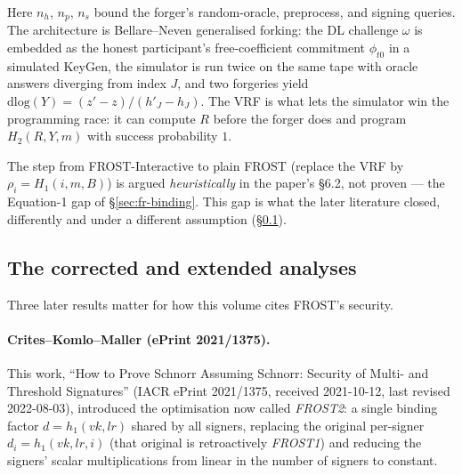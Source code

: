 \documentclass[11pt,a4paper]{article}
\theoremstyle{definition}
\begin{document}
Here $n_h$, $n_p$, $n_s$ bound the forger's random-oracle, preprocess,
and signing queries. The architecture is Bellare--Neven generalised
forking: the DL challenge $\omega$ is embedded as the honest
participant's free-coefficient commitment $\phi_{t0}$ in a simulated
KeyGen, the simulator is run twice on the same tape with oracle answers
diverging from index $J$, and two forgeries yield
$\mathrm{dlog}(Y) = (z' - z)/(h'_J - h_J)$. The VRF is what lets the
simulator win the programming race: it can compute $R$ before the forger
does and program $H_2(R, Y, m)$ with success probability $1$.

The step from FROST-Interactive to plain FROST (replace the VRF by
$\rho_i = H_1(i, m, B)$) is argued \emph{heuristically} in the paper's
\S6.2, not proven --- the Equation-1 gap of \S\ref{sec:fr-binding}. This
gap is what the later literature closed, differently and under a
different assumption (\S\ref{sec:fr-later}).

\subsection{The corrected and extended analyses}\label{sec:fr-later}

Three later results matter for how this volume cites FROST's security.

\paragraph{Crites--Komlo--Maller (ePrint 2021/1375).} This work, ``How
to Prove Schnorr Assuming Schnorr: Security of Multi- and Threshold
Signatures'' (IACR ePrint 2021/1375, received 2021-10-12, last revised
2022-08-03), introduced the optimisation now called \emph{FROST2}: a
single binding factor $d = h_1(vk, lr)$ shared by all signers,
replacing the original per-signer $d_i = h_1(vk, lr, i)$ (that original
is retroactively \emph{FROST1}) and reducing the signers' scalar
multiplications from linear in the number of signers to constant.
\end{document}
